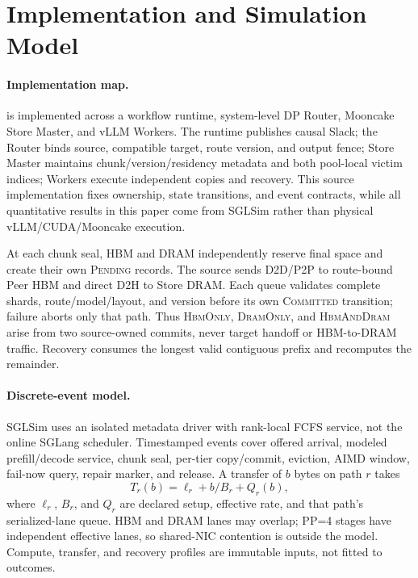 \section{Implementation and Simulation Model}
\label{sec:implementation}

\paragraph{Implementation map.}
\system{} is implemented across a workflow runtime, system-level DP Router,
Mooncake Store Master, and vLLM Workers.  The runtime publishes causal Slack;
the Router binds source, compatible target, route version, and output fence;
Store Master maintains chunk/version/residency metadata and both pool-local
victim indices; Workers execute independent copies and recovery.  This source
implementation fixes ownership, state transitions, and event contracts, while
all quantitative results in this paper come from SGLSim rather than physical
vLLM/CUDA/Mooncake execution.

At each chunk seal, HBM and DRAM independently reserve final space and create
their own \textsc{Pending} records.  The source sends D2D/P2P to route-bound
Peer HBM and direct D2H to Store DRAM.  Each queue validates complete shards,
route/model/layout, and version before its own \textsc{Committed} transition;
failure aborts only that path.  Thus \textsc{HbmOnly}, \textsc{DramOnly}, and
\textsc{HbmAndDram} arise from two source-owned commits, never target handoff
or HBM-to-DRAM traffic.  Recovery consumes the longest valid contiguous prefix
and recomputes the remainder.

\paragraph{Discrete-event model.}
SGLSim uses an isolated metadata driver with rank-local FCFS service, not the
online SGLang scheduler.  Timestamped events cover offered arrival, modeled
prefill/decode service, chunk seal, per-tier copy/commit, eviction, AIMD window,
fail-now query, repair marker, and release.  A transfer of $b$ bytes on path
$r$ takes
\begin{equation}
  T_r(b)=\ell_r+b/B_r+Q_r(b),
  \label{eq:sim-transfer}
\end{equation}
where $\ell_r$, $B_r$, and $Q_r$ are declared setup, effective rate, and that
path's serialized-lane queue.  HBM and DRAM lanes may overlap; PP=4 stages have
independent effective lanes, so shared-NIC contention is outside the model.
Compute, transfer, and recovery profiles are immutable inputs, not fitted to
outcomes.


